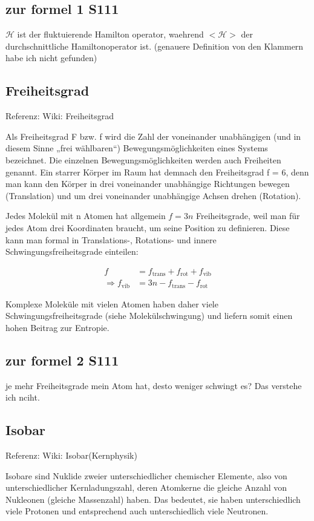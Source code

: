 \documentclass[]{article}
\begin{document}
\subsection{zur formel 1 S111}
$\mathcal{H}$ ist der fluktuierende Hamilton operator, waehrend $<\mathcal{H}> $ der durchschnittliche Hamiltonoperator ist. (genauere Definition von den Klammern habe ich nicht gefunden) 


\subsection{Freiheitsgrad}
Referenz: Wiki: Freiheitsgrad

Als Freiheitsgrad F bzw. f wird die Zahl der voneinander unabhängigen (und in diesem Sinne „frei wählbaren“) Bewegungsmöglichkeiten eines Systems bezeichnet. Die einzelnen Bewegungsmöglichkeiten werden auch Freiheiten genannt. Ein starrer Körper im Raum hat demnach den Freiheitsgrad f = 6, denn man kann den Körper in drei voneinander unabhängige Richtungen bewegen (Translation) und um drei voneinander unabhängige Achsen drehen (Rotation).

Jedes Molekül mit n Atomen hat allgemein $f = 3n$ Freiheitsgrade, weil man für jedes Atom drei Koordinaten braucht, um seine Position zu definieren. Diese kann man formal in Translations-, Rotations- und innere Schwingungsfreiheitsgrade einteilen:

\begin{align} f & = f_\mathrm{trans} + f_\mathrm{rot} + f_\mathrm{vib}\\ 
\Rightarrow f_\mathrm{vib} & = 3n - f_\mathrm{trans} - f_\mathrm{rot} 
\end{align}

Komplexe Moleküle mit vielen Atomen haben daher viele Schwingungsfreiheitsgrade (siehe Molekülschwingung) und liefern somit einen hohen Beitrag zur Entropie.


\subsection{zur formel 2 S111}
je  mehr Freiheitsgrade mein Atom hat, desto weniger schwingt es? Das verstehe ich nciht. 

\subsection{Isobar}
Referenz: Wiki: Isobar(Kernphysik)

Isobare sind Nuklide zweier unterschiedlicher chemischer Elemente, also von unterschiedlicher Kernladungszahl, deren Atomkerne die gleiche Anzahl von Nukleonen (gleiche Massenzahl) haben. Das bedeutet, sie haben unterschiedlich viele Protonen und entsprechend auch unterschiedlich viele Neutronen. 
\end{document}
